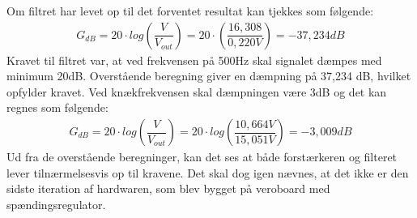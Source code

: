 Om filtret har levet op til det forventet resultat kan tjekkes som følgende:
\begin{align}
G_{dB}=20\cdot log\left(\dfrac{V}{V_{out}}\right)=20\cdot \left(\dfrac{16,308}{0,220V}\right)=-37,234dB
\end{align}
Kravet til filtret var, at ved frekvensen på 500Hz skal signalet dæmpes med minimum 20dB. Overstående beregning giver en dæmpning på 37,234 dB, hvilket opfylder kravet. Ved knækfrekvensen skal dæmpningen være 3dB og det kan regnes som følgende: 
\begin{align}
G_{dB}=20\cdot log\left(\dfrac{V}{V_{out}}\right) = 20\cdot log\left(\dfrac{10,664V}{15,051V}\right)=-3,009dB
\end{align}
Ud fra de overstående beregninger, kan det ses at både forstærkeren og filteret lever tilnærmelsesvis op til kravene. Det skal dog igen nævnes, at det ikke er den sidste iteration af hardwaren, som blev bygget på veroboard med spændingsregulator.
